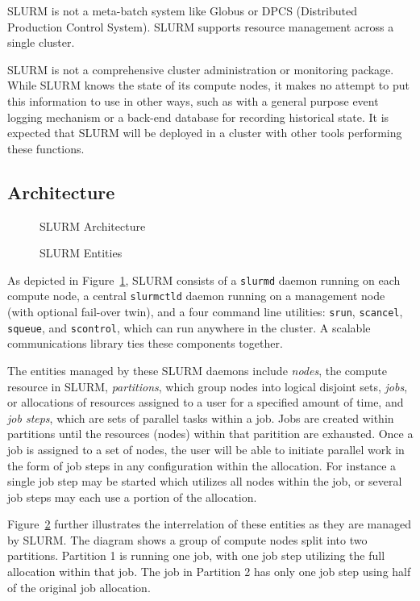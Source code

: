 SLURM is not a meta-batch system like Globus or DPCS (Distributed Production 
Control System).  SLURM supports resource management across a single cluster.

SLURM is not a comprehensive cluster administration or monitoring package.  
While SLURM knows the state of its compute nodes, it makes no attempt to put
this information to use in other ways, such as with a general purpose event
logging mechanism or a back-end database for recording historical state.
It is expected that SLURM will be deployed in a cluster with other 
tools performing these functions. 

\subsection{Architecture}


\begin{figure}[tb]
\centerline{}
\caption{SLURM Architecture}
\label{arch}
\end{figure}

\begin{figure}[tcb]
\centerline{}
\caption{SLURM Entities}
\label{entities}
\end{figure}


As depicted in Figure~\ref{arch}, SLURM consists of a {\tt slurmd} daemon
running on each compute node, a central {\tt slurmctld} daemon running on
a management node (with optional fail-over twin), and a four command line
utilities: {\tt srun}, {\tt scancel}, {\tt squeue}, and {\tt scontrol},
which can run anywhere in the cluster.  A scalable communications library
ties these components together.

The entities managed by these SLURM daemons include {\em nodes}, the
compute resource in SLURM, {\em partitions}, which group nodes into
logical disjoint sets, {\em jobs}, or allocations of resources assigned
to a user for a specified amount of time, and {\em job steps}, which are
sets of parallel tasks within a job.  Jobs are created within partitions
until the resources (nodes) within that paritition are exhausted. Once
a job is assigned to a set of nodes, the user will be able to initiate
parallel work in the form of job steps in any configuration within the
allocation. For instance a single job step may be started which utilizes
all nodes within the job, or several job steps may each use a portion
of the allocation.

Figure~\ref{entities} further illustrates the interrelation of these
entities as they are managed by SLURM. The diagram shows a group of
compute nodes split into two partitions. Partition 1 is running one
job, with one job step utilizing the full allocation within that job.
The job in Partition 2 has only one job step using half of the original
job allocation.

